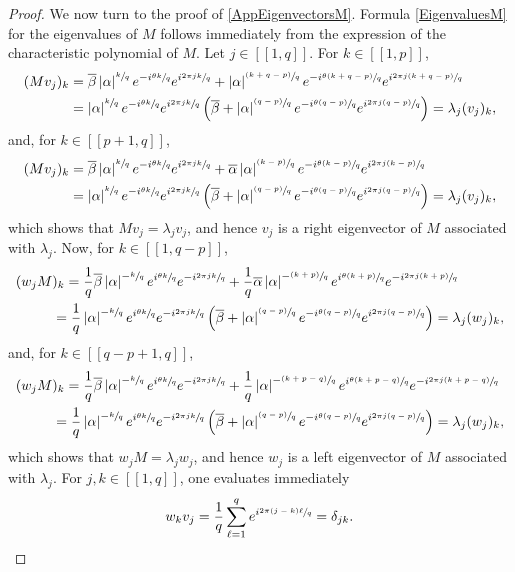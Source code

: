 \documentclass[10pt]{amsart}
\newcommand{\psfrac}[2]{\sfrac{(#1)}{#2}}
\newcommand{\llbracket}{[\![}
\newcommand{\rrbracket}{]\!]}
\theoremstyle{plain}
\theoremstyle{definition}
\newcommand{\abs}[1]{\left\lvert #1\right \rvert}
\begin{document}
\begin{proof}
We now turn to the proof of \eqref{AppEigenvectorsM}. Formula \eqref{EigenvaluesM} for the eigenvalues of $M$ follows immediately from the expression of the characteristic polynomial of $M$. Let $j \in \llbracket 1, q\rrbracket$. For $k \in \llbracket 1, p\rrbracket$,
\begin{align*}
(M v_j)_k & = \overline\beta \abs{\alpha}^{\sfrac{k}{q}} e^{-i \sfrac{\theta k}{q}} e^{i \sfrac{2\pi j k}{q}} + \abs{\alpha}^{\psfrac{k+q-p}{q}} e^{-i \sfrac{\theta (k+q-p)}{q}} e^{i \sfrac{2\pi j (k+q-p)}{q}} \\
& = \abs{\alpha}^{\sfrac{k}{q}} e^{-i \sfrac{\theta k}{q}} e^{i \sfrac{2\pi j k}{q}} \left(\overline\beta + \abs{\alpha}^{\psfrac{q-p}{q}} e^{-i \sfrac{\theta (q-p)}{q}} e^{i \sfrac{2\pi j (q-p)}{q}}\right) = \lambda_j (v_j)_k,
\end{align*}
and, for $k \in \llbracket p+1, q\rrbracket$,
\begin{align*}
(M v_j)_k & = \overline\beta \abs{\alpha}^{\sfrac{k}{q}} e^{-i \sfrac{\theta k}{q}} e^{i \sfrac{2\pi j k}{q}} + \overline\alpha \abs{\alpha}^{\psfrac{k-p}{q}} e^{-i \sfrac{\theta (k-p)}{q}} e^{i \sfrac{2\pi j (k-p)}{q}} \\
& = \abs{\alpha}^{\sfrac{k}{q}} e^{-i \sfrac{\theta k}{q}} e^{i \sfrac{2\pi j k}{q}} \left(\overline\beta + \abs{\alpha}^{\psfrac{q-p}{q}} e^{-i \sfrac{\theta (q-p)}{q}} e^{i \sfrac{2\pi j (q-p)}{q}}\right) = \lambda_j (v_j)_k,
\end{align*}
which shows that $M v_j = \lambda_j v_j$, and hence $v_j$ is a right eigenvector of $M$ associated with $\lambda_j$. Now, for $k \in \llbracket 1, q-p\rrbracket$,
\begin{align*}
(w_j M&)_k = \frac{1}{q} \overline\beta \abs{\alpha}^{-\sfrac{k}{q}} e^{i \sfrac{\theta k}{q}} e^{-i \sfrac{2\pi j k}{q}} + \frac{1}{q} \overline\alpha \abs{\alpha}^{-\psfrac{k+p}{q}} e^{i \sfrac{\theta (k+p)}{q}} e^{-i \sfrac{2\pi j (k+p)}{q}} \\
& = \frac{1}{q} \abs{\alpha}^{-\sfrac{k}{q}} e^{i \sfrac{\theta k}{q}} e^{-i \sfrac{2\pi j k}{q}} \left(\overline\beta + \abs{\alpha}^{\psfrac{q-p}{q}} e^{-i \sfrac{\theta (q-p)}{q}} e^{i \sfrac{2\pi j (q-p)}{q}}\right) = \lambda_j (w_j)_k,
\end{align*}
and, for $k \in \llbracket q-p+1, q\rrbracket$,
\begin{align*}
(w_j M&)_k = \frac{1}{q} \overline\beta \abs{\alpha}^{-\sfrac{k}{q}} e^{i \sfrac{\theta k}{q}} e^{-i \sfrac{2\pi j k}{q}} + \frac{1}{q} \abs{\alpha}^{-\psfrac{k+p-q}{q}} e^{i \sfrac{\theta (k+p-q)}{q}} e^{-i \sfrac{2\pi j (k+p-q)}{q}} \\
& = \frac{1}{q} \abs{\alpha}^{-\sfrac{k}{q}} e^{i \sfrac{\theta k}{q}} e^{-i \sfrac{2\pi j k}{q}} \left(\overline\beta + \abs{\alpha}^{\psfrac{q-p}{q}} e^{-i \sfrac{\theta (q-p)}{q}} e^{i \sfrac{2\pi j (q-p)}{q}}\right) = \lambda_j (w_j)_k,
\end{align*}
which shows that $w_j M = \lambda_j w_j$, and hence $w_j$ is a left eigenvector of $M$ associated with $\lambda_j$. For $j, k \in \llbracket 1, q\rrbracket$, one evaluates immediately
\[
w_k v_j = \frac{1}{q} \sum_{\ell=1}^q e^{i \sfrac{2\pi (j - k) \ell}{q}} = \delta_{jk}.
\]


\end{proof}
\end{document}
